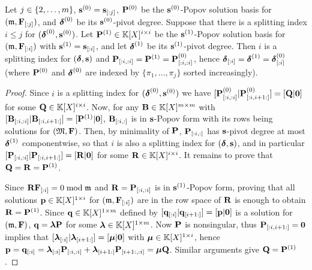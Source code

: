 \documentclass[preprint]{sig-alternate-05-2015}
\begin{document}
\vspace{-0.2cm}
\begin{lem}
  \label{lem:one:splitting_index}
  Let $j \in \{2,\ldots,m\}$, $\mathbf{s}^{(0)} = \mathbf{s}_{[:j]}$,
  $\msb^{(0)}$ be the $\mathbf{s}^{(0)}$-Popov solution basis for
  $(\modulus,\subVec{\sys}{}{j})$, and $\boldsymbol{\delta}^{(0)}$ be its
  $\mathbf{s}^{(0)}$-pivot degree. Suppose that there is a splitting index $i \le
  j$ for $(\boldsymbol{\delta}^{(0)},\mathbf{s}^{(0)})$. Let $\msb^{(1)} \in \polMatSpace[i]$
  be the $\mathbf{s}^{(1)}$-Popov solution basis for
  $(\modulus,\subVec{\sys}{}{i})$ with $\mathbf{s}^{(1)} = \mathbf{s}_{[:i]}$,
  and let $\boldsymbol{\delta}^{(1)}$ be its $\mathbf{s}^{(1)}$-pivot degree. Then $i$ is a
  splitting index for $(\boldsymbol{\delta},\mathbf{s})$ and $\subMat{\msb}{}{i}{}{i} =
  \msb^{(1)} = \subMat{\msb^{(0)}}{}{i}{}{i}$, hence $\boldsymbol{\delta}_{[:i]} =
  \boldsymbol{\delta}^{(1)} = \boldsymbol{\delta}^{(0)}_{[:i]}$ (where $\msb^{(0)}$ and
  $\boldsymbol{\delta}^{(0)}$ are indexed by $\{\pi_1,\ldots,\pi_j\}$ sorted
  increasingly).
\end{lem}
\begin{proof}
\vspace{-0.2cm}
  Since $i$ is a splitting index for $(\boldsymbol{\delta}^{(0)},\mathbf{s}^{(0)})$ we have
  $[\subMat{\msb^{(0)}}{}{i}{}{i} | \subMat{\msb^{(0)}}{}{i}{i+1}{}] = [\mat{Q}
  | \mat{0} ]$ for some $\mat{Q} \in \polMatSpace[i]$. Now, for any $\mat{B}
  \in \polMatSpace[\nbun][\nbun]$ with $[\subMat{\mat{B}}{}{i}{}{i} |
  \subMat{\mat{B}}{}{i}{i+1}{}] = [\msb^{(1)} | \mat{0}]$,
  $\subMat{\mat{B}}{}{i}{}{}$ is in $\mathbf{s}$-Popov form with its rows being
  solutions for $(\Modulus,\sys)$. Then, by minimality of $\msb$,
  $\subMat{\msb}{}{i}{}{}$ has $\mathbf{s}$-pivot degree at most $\boldsymbol{\delta}^{(1)}$
  componentwise, so that $i$ is also a splitting index for
  $(\boldsymbol{\delta},\mathbf{s})$, and in particular $[\subMat{\msb}{}{i}{}{i} |
  \subMat{\msb}{}{i}{i+1}{}] = [\mat{R} | \mat{0} ]$ for some $\mat{R} \in
  \polMatSpace[i]$. It remains to prove that $\mat{Q} = \mat{R} = \msb^{(1)}$.

  Since $\mat{R} \subVec{\sys}{}{i} = 0 \bmod \modulus$ and $\mat{R} =
  \subMat{\msb}{}{i}{}{i}$ is in $\mathbf{s}^{(1)}$-Popov form, proving that all
  solutions $\row{p} \in \polMatSpace[1][i]$ for
  $(\modulus,\subVec{\sys}{}{i})$ are in the row space of $\mat{R}$ is enough
  to obtain $\mat{R} = \msb^{(1)}$. Since $\row{q} \in \polMatSpace[1][\nbun]$
  defined by $[\subVec{\row{q}}{}{i} | \subVec{\row{q}}{i+1}{}] = [\row{p} |
  \mat{0}]$ is a solution for $(\modulus,\sys)$, $\row{q} =
  \boldsymbol{\lambda} \msb$ for some $\boldsymbol{\lambda} \in
  \polMatSpace[1][\nbun]$. Now $\msb$ is nonsingular, thus
  $\subMat{\msb}{}{i}{i+1}{} = \mat{0}$ implies that
  $[\subVec{\boldsymbol{\lambda}}{}{i} | \subVec{\boldsymbol{\lambda}}{i+1}{}]
  = [\boldsymbol{\mu} | \row{0}]$ with $\boldsymbol{\mu} \in
  \polMatSpace[1][i]$, hence $\row{p} = \subVec{\row{q}}{}{i} =
  \subVec{\boldsymbol{\lambda}}{}{i} \subMat{\msb}{}{i}{}{i} +
  \subVec{\boldsymbol{\lambda}}{i+1}{} \subMat{\msb}{i+1}{}{}{i} =
  \boldsymbol{\mu} \mat{Q}$. Similar arguments give $\mat{Q} = \msb^{(1)}$.
\end{proof}
\end{document}
